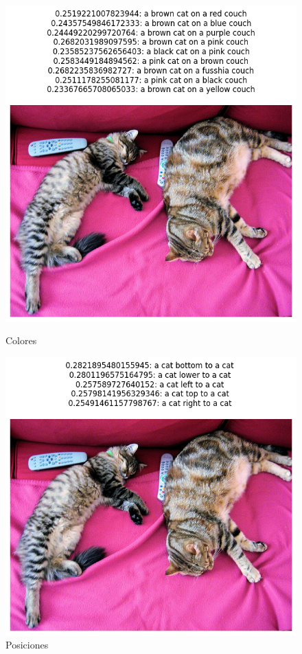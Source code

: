 \begin{figure}[H]
\centering
\begin{minipage}{0.45\textwidth}
 \includegraphics[width=\textwidth]{Graphics/clip_color.png}
 \caption{Colores}
 \label{fig:color}
\end{minipage}%
\begin{minipage}{0.45\textwidth}
 \includegraphics[width=\textwidth]{Graphics/clip_pos.png}
 \caption{Posiciones}
 \label{fig:region}
\end{minipage}
\end{figure}

